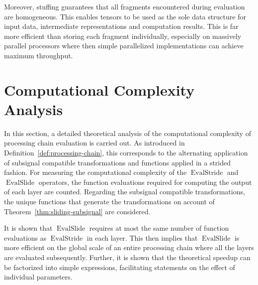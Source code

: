 \documentclass[journal]{IEEEtran}
\DeclareMathOperator{\EvalStride}{EvalStride}
\DeclareMathOperator{\EvalSlide}{EvalSlide}
\begin{document}
Moreover, stuffing guarantees that all fragments encountered during evaluation are homogeneous.
This enables tensors to be used as the sole data structure for input data, intermediate representations and computation results.
This is far more efficient than storing each fragment individually, especially on massively parallel processors where then simple parallelized implementations can achieve maximum throughput.

\section{Computational Complexity Analysis}
\label{sect:computational_complexity}
In this section, a detailed theoretical analysis of the computational complexity of processing chain evaluation is carried out.
As introduced in Definition~\ref{def:processing-chain}, this corresponds to the alternating application of subsignal compatible transformations and functions applied in a strided fashion.
For measuring the computational complexity of the $\EvalStride$ and $\EvalSlide$ operators, the function evaluations required for computing the output of each layer are counted.
Regarding the subsignal compatible transformations, the unique functions that generate the transformations on account of Theorem~\ref{thm:sliding-subsignal} are considered.

It is shown that $\EvalSlide$ requires at most the same number of function evaluations as $\EvalStride$ in each layer.
This then implies that $\EvalSlide$ is more efficient on the global scale of an entire processing chain where all the layers are evaluated subsequently.
Further, it is shown that the theoretical speedup can be factorized into simple expressions, facilitating statements on the effect of individual parameters.
\end{document}

